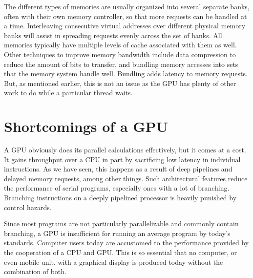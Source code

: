 \documentclass[../main/report.tex]{subfiles}
\begin{document}
The different types of memories are usually organized into several separate banks, often with their own memory controller, so that more requests can be handled at a time.
Interleaving consecutive virtual addresses over different physical memory banks will assist in spreading requests evenly across the set of banks. 
All memories typically have multiple levels of cache associated with them as well.
Other techniques to improve memory bandwidth include data compression to reduce the amount of bits to transfer, and bundling memory accesses into sets that the memory system handle well.
Bundling adds latency to memory requests.
But, as mentioned earlier, this is not an issue as the GPU has plenty of other work to do while a particular thread waits.

\section{Shortcomings of a GPU}


A GPU obviously does its parallel calculations effectively, but it comes at a cost.
It gains throughput over a CPU in part by sacrificing low latency in individual instructions.
As we have seen, this happens as a result of deep pipelines and delayed memory requests, among other things.
Such architectural features reduce the performance of serial programs, especially ones with a lot of branching.
Branching instructions on a deeply pipelined processor is heavily punished by control hazards.

Since most programs are not particularly parallelizable and commonly contain branching, a GPU is insufficient for running an average program by today's standards.
Computer users today are accustomed to the performance provided by the cooperation of a CPU and GPU.
This is so essential that no computer, or even mobile unit, with a graphical display is produced today without the combination of both.
\end{document}

